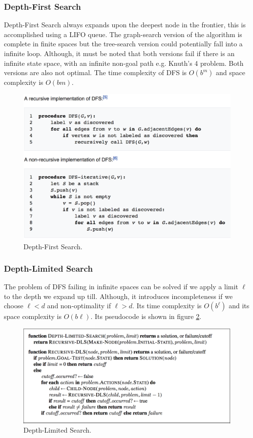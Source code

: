 \documentclass[twoside]{article}
\begin{document}
\subsubsection{Depth-First Search}
Depth-First Search always expands upon the deepest node in the frontier, this
is accomplished using a LIFO queue. The graph-search version of the algorithm
is complete in finite spaces but the tree-search version could potentially
fall into a infinite loop. Although, it must be noted that both versions fail
if there is an infinite state space, with an infinite non-goal path e.g.
Knuth's 4 problem. Both versions are also not optimal. The time complexity of
DFS is \(O(b^m)\) and space complexity is \(O(bm)\).
\begin{figure}
  \includegraphics[width=\linewidth]{dfs.png}
  \caption{Depth-First Search.}
  \label{fig:dfs}
\end{figure}
\subsubsection{Depth-Limited Search}
The problem of DFS failing in infinite spaces can be solved if we apply a
limit \(\ell\) to the depth we expand up till. Although, it introduces 
incompleteness if we choose \(\ell < d\) and non-optimality if \(\ell > d \). Its 
time complexity is \(O(b^\ell)\) and its space complexity is \(O(b\ell)\). Its 
pseudocode is shown in figure \ref{fig:dls}.
\begin{figure}
  \includegraphics[width=\linewidth]{dls.png}
  \caption{Depth-Limited Search.}
  \label{fig:dls}
\end{figure}
\end{document}

